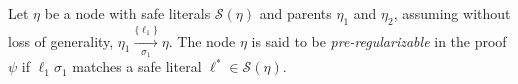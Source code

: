 

\begin{definition}
\label{prop:pair}
Let $\eta$ be a node with safe literals $\mathcal{S}(\eta)$ and parents $\eta_1$ and $\eta_2$, assuming without loss of generality, $\eta_1 \xrightarrow[\sigma_1]{\{\ell_1\} } \eta$.
The node $\eta$ is said to be \emph{pre-regularizable} in the proof $\psi$ if $\ell_1\sigma_1$ matches a safe literal $\ell^* \in \mathcal{S}(\eta)$.
\end{definition}

\noindent


